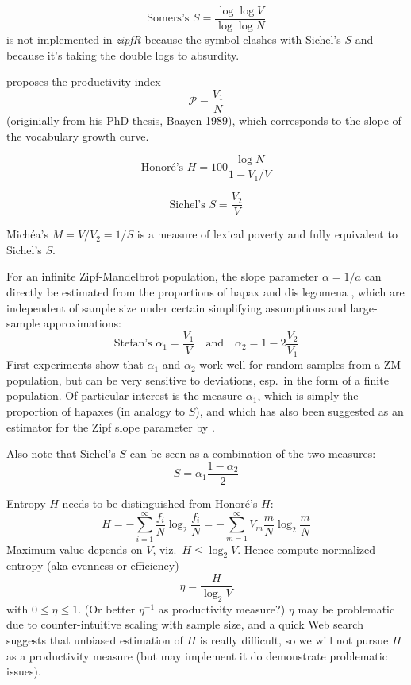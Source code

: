 \documentclass[a4paper]{article}
\begin{document}
\begin{equation}
  \label{eq:prod:summer-S}
  \text{Somers's } S = \frac{\log \log V}{\log \log N}
\end{equation}
is not implemented in \emph{zipfR} because the symbol clashes with Sichel's
$S$ and because it's taking the double logs to absurdity.

\citet{Baayen:92} proposes the productivity index
\[
\mathscr{P} = \frac{V_1}{N}
\]
(originially from his PhD thesis, Baayen 1989), which corresponds to the slope
of the vocabulary growth curve.

\begin{equation}
  \label{eq:prod:honore-H}
  \text{Honoré's } H = 100 \frac{\log N}{1 - V_1 / V}
\end{equation}

\begin{equation}
  \label{eq:prod:sichel-S}
  \text{Sichel's } S = \frac{V_2}{V}
\end{equation}

Michéa's $M = V / V_2 = 1/S$ is a measure of lexical poverty and fully
equivalent to Sichel's $S$.

For an infinite Zipf-Mandelbrot population, the slope parameter $\alpha = 1/a$
can directly be estimated from the proportions of hapax
\citep[130]{Evert:04phd} and dis legomena \citep[127]{Evert:04phd}, which are
independent of sample size under certain simplifying assumptions and
large-sample approximations:
\[
\text{Stefan's } 
\alpha_1 = \frac{V_1}{V} \quad\text{and}\quad
\alpha_2 = 1 - 2\frac{V_2}{V_1} 
\]
First experiments show that $\alpha_1$ and $\alpha_2$ work well for random
samples from a ZM population, but can be very sensitive to deviations, esp.\
in the form of a finite population.  Of particular interest is the measure
$\alpha_1$, which is simply the proportion of hapaxes (in analogy to $S$),
and which has also been suggested as an estimator for the Zipf slope parameter
by \citet[172]{Rouault:78}.

Also note that Sichel's $S$ can be seen as a combination of the two measures:
\[
S = \alpha_1 \frac{1 - \alpha_2}{2}
\]

Entropy $H$ needs to be distinguished from Honoré's $H$:
\begin{equation}
  \label{eq:prod:entropy}
  H = - \sum_{i=1}^{\infty} \frac{f_i}{N} \log_2 \frac{f_i}{N}
  = -\sum_{m=1}^{\infty} V_m \frac{m}{N} \log_2 \frac{m}{N}
\end{equation}
Maximum value depends on $V$, viz.\ $H\leq \log_2 V$. Hence compute normalized
entropy (aka evenness or efficiency)
\begin{equation}
  \label{eq:prod:evenness}
  \eta = \frac{H}{\log_2 V}
\end{equation}
with $0\leq \eta\leq 1$. (Or better $\eta^{-1}$ as productivity measure?)
$\eta$ may be problematic due to counter-intuitive scaling with sample size,
and a quick Web search suggests that unbiased estimation of $H$ is really
difficult, so we will not pursue $H$ as a productivity measure (but may
implement it do demonstrate problematic issues).
\end{document}
